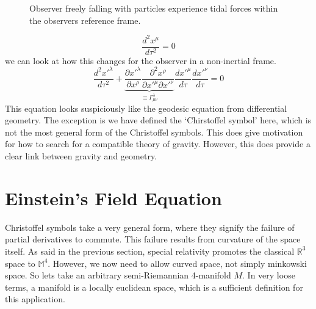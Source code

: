 \begin{figure}
    \centering
    \caption{Observer freely falling with particles experience tidal forces within the observers reference frame.}
\end{figure}
\begin{equation}
    \frac{d^2x^\mu}{d\tau^2} = 0
\end{equation} 
we can look at how this changes for the observer in a non-inertial frame.
\begin{equation}
    \frac{d^2x'^\lambda}{d\tau^2}+\underbrace{\frac{\partial x'^\lambda}{\partial x^\rho}\frac{\partial^2 x^\rho}{\partial x'^\mu \partial x'^\nu}}_{\equiv \Gamma_{\mu\nu}^\lambda} \frac{d x'^\mu}{d \tau} \frac{d x'^\nu}{d \tau} = 0
\end{equation}
This equation looks suspiciously like the geodesic equation from differential geometry. The exception is we have defined the `Chirstoffel symbol' here, which is not the most general form of the Christoffel symbols. This does give motivation for how to search for a compatible theory of gravity. However, this does provide a clear link between gravity and geometry. 
\section{Einstein's Field Equation}
Christoffel symbols take a very general form, where they signify the failure of partial derivatives to commute. This failure results from curvature of the space itself. As said in the previous section, special relativity promotes the classical $\mathbb{R}^3$ space to $\mathbb{M}^4$. However, we now need to allow curved space, not simply minkowski space. So lets take an arbitrary semi-Riemannian 4-manifold $M$. In very loose terms, a manifold is a locally euclidean space, which is a sufficient definition for this application.

